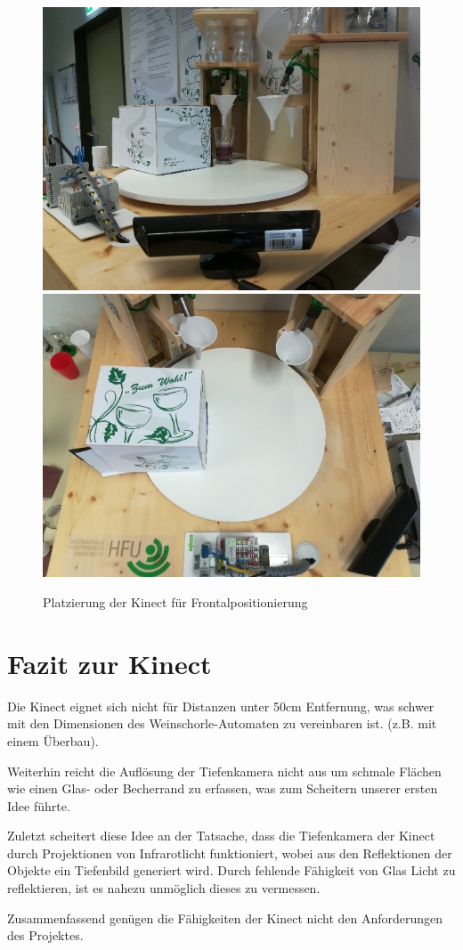 \begin{figure}[!h]
	\centering
	\includegraphics[width=0.45\linewidth]{content/pictures/position_zur_Frontalperspektive_behind}
	\includegraphics[width=0.45\linewidth]{content/pictures/position_zur_Frontalperspektive_top}
	\caption{Platzierung der Kinect für Frontalpositionierung}
	\label{fig:position_zur_frontalperspektive}
\end{figure}

\section{Fazit zur Kinect}
Die Kinect eignet sich nicht für Distanzen unter 50cm Entfernung, was schwer mit den Dimensionen des Weinschorle-Automaten zu vereinbaren ist. (z.B. mit einem Überbau). 

Weiterhin reicht die Auflösung der Tiefenkamera nicht aus um schmale Flächen wie einen Glas- oder Becherrand zu erfassen, was zum Scheitern unserer ersten Idee führte. 

Zuletzt scheitert diese Idee an der Tatsache, dass die Tiefenkamera der Kinect durch Projektionen von Infrarotlicht funktioniert, wobei aus den Reflektionen der Objekte ein Tiefenbild generiert wird. Durch fehlende Fähigkeit von Glas Licht zu reflektieren, ist es nahezu unmöglich dieses zu vermessen. 

Zusammenfassend genügen die Fähigkeiten der Kinect nicht den Anforderungen des Projektes.
